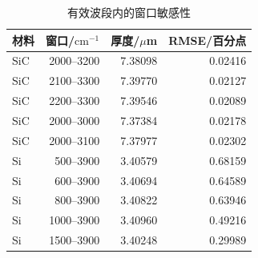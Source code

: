 \begin{table}[htbp]\centering
\caption{有效波段内的窗口敏感性}\label{tab:windows}
\begin{tabular}{lrrr}
\toprule
材料 & 窗口/$\mathrm{cm}^{-1}$ & 厚度/$\mu$m & RMSE/百分点\\\midrule
SiC & 2000--3200 & 7.38098 & 0.02416\\
SiC & 2100--3300 & 7.39770 & 0.02127\\
SiC & 2200--3300 & 7.39546 & 0.02089\\
SiC & 2000--3000 & 7.37384 & 0.02178\\
SiC & 2000--3100 & 7.37977 & 0.02302\\
Si & 500--3900 & 3.40579 & 0.68159\\
Si & 600--3900 & 3.40694 & 0.64589\\
Si & 800--3900 & 3.40822 & 0.63946\\
Si & 1000--3900 & 3.40960 & 0.49216\\
Si & 1500--3900 & 3.40248 & 0.29989\\
\bottomrule
\end{tabular}\end{table}
